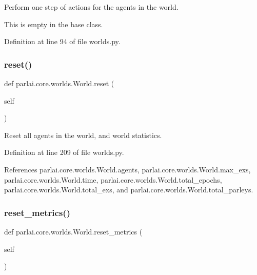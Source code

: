 \begin{DoxyVerb}Perform one step of actions for the agents in the world.

This is empty in the base class.
\end{DoxyVerb}
 

Definition at line 94 of file worlds.\+py.

\mbox{\label{classparlai_1_1core_1_1worlds_1_1World_a363cc32add41645e1ba405808fafb5b4}} 
\subsubsection{\texorpdfstring{reset()}{reset()}}
{\footnotesize\ttfamily def parlai.\+core.\+worlds.\+World.\+reset (\begin{DoxyParamCaption}\item[{}]{self }\end{DoxyParamCaption})}

\begin{DoxyVerb}Reset all agents in the world, and world statistics.\end{DoxyVerb}
 

Definition at line 209 of file worlds.\+py.



References parlai.\+core.\+worlds.\+World.\+agents, parlai.\+core.\+worlds.\+World.\+max\+\_\+exs, parlai.\+core.\+worlds.\+World.\+time, parlai.\+core.\+worlds.\+World.\+total\+\_\+epochs, parlai.\+core.\+worlds.\+World.\+total\+\_\+exs, and parlai.\+core.\+worlds.\+World.\+total\+\_\+parleys.

\mbox{\label{classparlai_1_1core_1_1worlds_1_1World_af26e2aacab6282f8ef19f278d638adea}} 
\subsubsection{\texorpdfstring{reset\+\_\+metrics()}{reset\_metrics()}}
{\footnotesize\ttfamily def parlai.\+core.\+worlds.\+World.\+reset\+\_\+metrics (\begin{DoxyParamCaption}\item[{}]{self }\end{DoxyParamCaption})}

